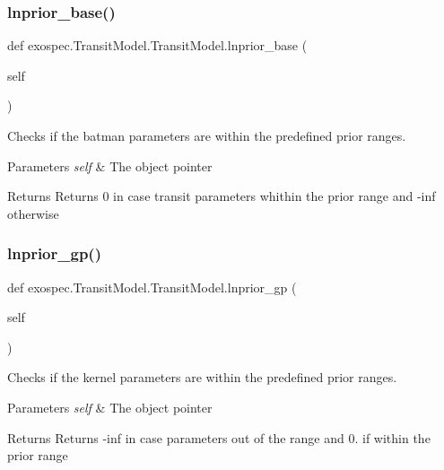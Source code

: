 \subsubsection{\texorpdfstring{lnprior\+\_\+base()}{lnprior\_base()}}
{\footnotesize\ttfamily def exospec.\+Transit\+Model.\+Transit\+Model.\+lnprior\+\_\+base (\begin{DoxyParamCaption}\item[{}]{self }\end{DoxyParamCaption})}



Checks if the batman parameters are within the predefined prior ranges. 


\begin{DoxyParams}{Parameters}
{\em self} & The object pointer \\
\hline
\end{DoxyParams}
\begin{DoxyReturn}{Returns}
Returns 0 in case transit parameters whithin the prior range and -\/inf otherwise 
\end{DoxyReturn}
\mbox{\label{classexospec_1_1_transit_model_1_1_transit_model_a2c0c838bfee6bdeac30082ebc6cc9517}} 
\subsubsection{\texorpdfstring{lnprior\+\_\+gp()}{lnprior\_gp()}}
{\footnotesize\ttfamily def exospec.\+Transit\+Model.\+Transit\+Model.\+lnprior\+\_\+gp (\begin{DoxyParamCaption}\item[{}]{self }\end{DoxyParamCaption})}



Checks if the kernel parameters are within the predefined prior ranges. 


\begin{DoxyParams}{Parameters}
{\em self} & The object pointer \\
\hline
\end{DoxyParams}
\begin{DoxyReturn}{Returns}
Returns -\/inf in case parameters out of the range and 0. if within the prior range 
\end{DoxyReturn}
\mbox{\label{classexospec_1_1_transit_model_1_1_transit_model_aa791197371e843567a9fdb8565abf154}} 
